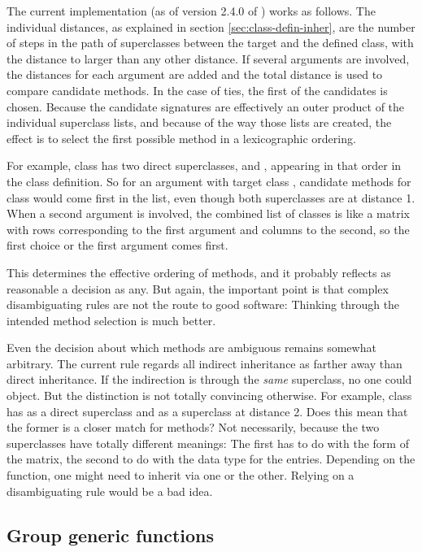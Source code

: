 \documentclass[11pt]{article}
\begin{document}
The current implementation (as of version 2.4.0 of \R{}) works as follows.
The individual distances, as explained in section \ref{sec:class-defin-inher}, are the number of steps in the path of superclasses between the target and the defined class, with the distance to  larger than any other distance.
If several arguments are involved, the distances for each argument are added and the total distance is used to compare candidate methods.
In the case of ties, the first of the candidates is chosen.
Because the candidate signatures are effectively an outer product of the individual superclass lists, and because of the way those lists are created, the effect is to select the first possible method in a lexicographic ordering.

For example, class  has two direct superclasses,  and , appearing in that order in the class definition.
So for an argument with target class , candidate methods for class  would come first in the list, even though both superclasses are at distance 1.
When a second argument is involved, the combined list of classes is like a matrix with rows corresponding to the first argument and columns to the second, so the first choice or the first argument comes first.

This determines the effective ordering of methods, and it probably reflects as reasonable a decision as any.
But again, the important point is that complex disambiguating rules are not the route to good software:  Thinking through the intended method selection is much better.

Even the decision about which methods are ambiguous remains somewhat arbitrary.
The current rule regards all indirect inheritance as farther away than direct inheritance.
If the indirection is through the \emph{same}  superclass, no one could object.
But the distinction is not totally convincing otherwise.
For example, class  has  as a direct superclass and  as a superclass at distance 2.
Does this mean that the former is a closer match for methods?
Not necessarily, because the two superclasses have totally different meanings:  The first has to do with the form of the matrix, the second to do with the data type for the entries.
Depending on the function, one might need to inherit via one or the other.
Relying on a disambiguating rule would be a bad idea.

\subsection*{Group generic functions}
\label{sec:group-gener-funct}
\end{document}

